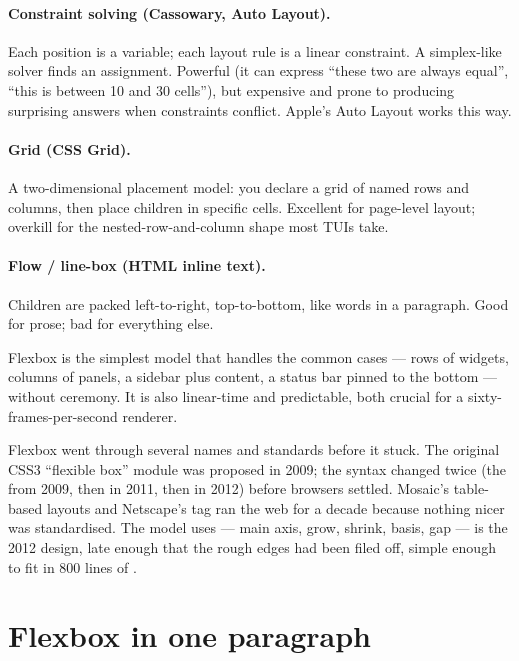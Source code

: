 \paragraph{Constraint solving (Cassowary, Auto Layout).} Each
position is a variable; each layout rule is a linear constraint.
A simplex-like solver finds an assignment. Powerful (it can express
``these two are always equal'', ``this is between 10 and 30
cells''), but expensive and prone to producing surprising answers
when constraints conflict. Apple's Auto Layout works this way.

\paragraph{Grid (CSS Grid).} A two-dimensional placement model:
you declare a grid of named rows and columns, then place children
in specific cells. Excellent for page-level layout; overkill for
the nested-row-and-column shape most TUIs take.

\paragraph{Flow / line-box (HTML inline text).} Children are
packed left-to-right, top-to-bottom, like words in a paragraph.
Good for prose; bad for everything else.

Flexbox is the simplest model that handles the common cases ---
rows of widgets, columns of panels, a sidebar plus content, a
status bar pinned to the bottom --- without ceremony. It is also
linear-time and predictable, both crucial for a sixty-frames-per-second
renderer.

\begin{funfact}
Flexbox went through several names and standards before it stuck.
The original CSS3 ``flexible box'' module was proposed in 2009;
the syntax changed twice (the  from 2009, then
 in 2011, then  in 2012)
before browsers settled. Mosaic's table-based layouts and
Netscape's  tag ran the web for a decade because
nothing nicer was standardised. The model \maya{} uses --- main
axis, grow, shrink, basis, gap --- is the 2012 design, late enough
that the rough edges had been filed off, simple enough to fit in
800 lines of \cpp{}.
\end{funfact}

\section{Flexbox in one paragraph}


